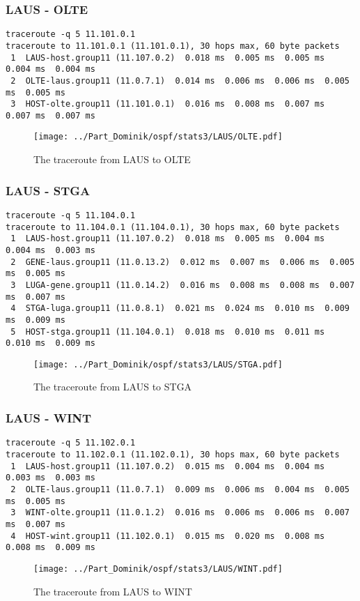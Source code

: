 \subsubsection{LAUS - OLTE}
\begin{lstlisting}
traceroute -q 5 11.101.0.1
traceroute to 11.101.0.1 (11.101.0.1), 30 hops max, 60 byte packets
 1  LAUS-host.group11 (11.107.0.2)  0.018 ms  0.005 ms  0.005 ms  0.004 ms  0.004 ms
 2  OLTE-laus.group11 (11.0.7.1)  0.014 ms  0.006 ms  0.006 ms  0.005 ms  0.005 ms
 3  HOST-olte.group11 (11.101.0.1)  0.016 ms  0.008 ms  0.007 ms  0.007 ms  0.007 ms
\end{lstlisting}
\begin{figure}[H]
\centering
\texttt{[image: ../Part\_Dominik/ospf/stats3/LAUS/OLTE.pdf]}
\caption{The traceroute from LAUS to OLTE}
\end{figure}
\clearpage
\subsubsection{LAUS - STGA}
\begin{lstlisting}
traceroute -q 5 11.104.0.1
traceroute to 11.104.0.1 (11.104.0.1), 30 hops max, 60 byte packets
 1  LAUS-host.group11 (11.107.0.2)  0.018 ms  0.005 ms  0.004 ms  0.004 ms  0.003 ms
 2  GENE-laus.group11 (11.0.13.2)  0.012 ms  0.007 ms  0.006 ms  0.005 ms  0.005 ms
 3  LUGA-gene.group11 (11.0.14.2)  0.016 ms  0.008 ms  0.008 ms  0.007 ms  0.007 ms
 4  STGA-luga.group11 (11.0.8.1)  0.021 ms  0.024 ms  0.010 ms  0.009 ms  0.009 ms
 5  HOST-stga.group11 (11.104.0.1)  0.018 ms  0.010 ms  0.011 ms  0.010 ms  0.009 ms
\end{lstlisting}
\begin{figure}[H]
\centering
\texttt{[image: ../Part\_Dominik/ospf/stats3/LAUS/STGA.pdf]}
\caption{The traceroute from LAUS to STGA}
\end{figure}
\clearpage
\subsubsection{LAUS - WINT}
\begin{lstlisting}
traceroute -q 5 11.102.0.1
traceroute to 11.102.0.1 (11.102.0.1), 30 hops max, 60 byte packets
 1  LAUS-host.group11 (11.107.0.2)  0.015 ms  0.004 ms  0.004 ms  0.003 ms  0.003 ms
 2  OLTE-laus.group11 (11.0.7.1)  0.009 ms  0.006 ms  0.004 ms  0.005 ms  0.005 ms
 3  WINT-olte.group11 (11.0.1.2)  0.016 ms  0.006 ms  0.006 ms  0.007 ms  0.007 ms
 4  HOST-wint.group11 (11.102.0.1)  0.015 ms  0.020 ms  0.008 ms  0.008 ms  0.009 ms
\end{lstlisting}
\begin{figure}[H]
\centering
\texttt{[image: ../Part\_Dominik/ospf/stats3/LAUS/WINT.pdf]}
\caption{The traceroute from LAUS to WINT}
\end{figure}
\clearpage
